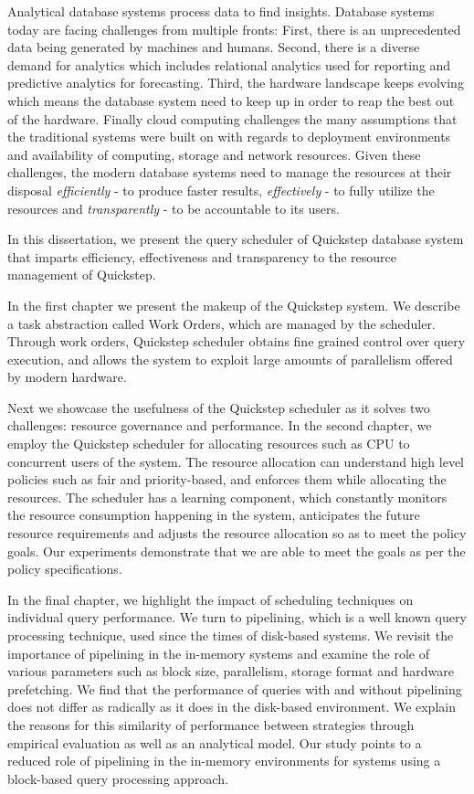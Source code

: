 Analytical database systems process data to find insights. 
Database systems today are facing challenges from multiple fronts: First, there is an unprecedented data being generated by machines and humans.
Second, there is a diverse demand for analytics which includes relational analytics used for reporting and predictive analytics for forecasting.
Third, the hardware landscape keeps evolving which means the database system need to keep up in order to reap the best out of the hardware.
Finally cloud computing challenges the many assumptions that the traditional systems were built on with regards to deployment environments and availability of computing, storage and network resources.
Given these challenges, the modern database systems need to manage the resources at their disposal \textit{efficiently} - to produce faster results, \textit{effectively} - to fully utilize the resources and \textit{transparently} - to be accountable to its users.

In this dissertation, we present the query scheduler of Quickstep database system that imparts efficiency, effectiveness and transparency to the resource management of Quickstep. 

In the first chapter we present the makeup of the Quickstep system. 
We describe a task abstraction called Work Orders, which are managed by the scheduler.
Through work orders, Quickstep scheduler obtains fine grained control over query execution, and allows the system to exploit large amounts of parallelism offered by modern hardware.

Next we showcase the usefulness of the Quickstep scheduler as it solves two challenges: resource governance and performance.
In the second chapter, we employ the Quickstep scheduler for allocating resources such as CPU to concurrent users of the system.
The resource allocation can understand high level policies such as fair and priority-based, and enforces them while allocating the resources.
The scheduler has a learning component, which constantly monitors the resource consumption happening in the system, anticipates the future resource requirements and adjusts the resource allocation so as to meet the policy goals.
Our experiments demonstrate that we are able to meet the goals as per the policy specifications.

In the final chapter, we highlight the impact of scheduling techniques on individual query performance.
We turn to pipelining, which is a well known query processing technique, used since the times of disk-based systems.
We revisit the importance of pipelining in the in-memory systems and examine the role of various parameters such as block size, parallelism, storage format and hardware prefetching.
We find that the performance of queries with and without pipelining does not differ as radically as it does in the disk-based environment.
We explain the reasons for this similarity of performance between strategies through empirical evaluation as well as an analytical model.
Our study points to a reduced role of pipelining in the in-memory environments for systems using a block-based query processing approach. 